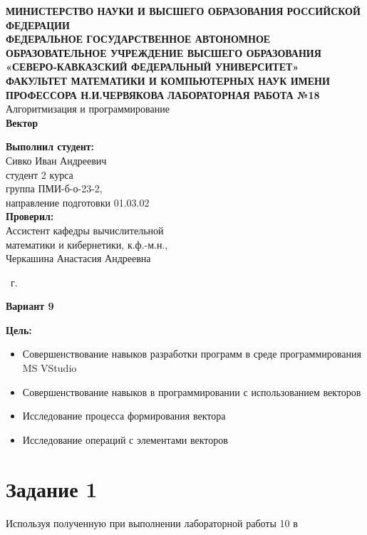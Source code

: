 \documentclass[14pt,a4paper]{article}
\begin{document}
\begin{titlepage}
  \begin{center}
    {\large\scshape\bfseries
    МИНИСТЕРСТВО НАУКИ И ВЫСШЕГО ОБРАЗОВАНИЯ РОССИЙСКОЙ ФЕДЕРАЦИИ\\
    ФЕДЕРАЛЬНОЕ ГОСУДАРСТВЕННОЕ АВТОНОМНОЕ ОБРАЗОВАТЕЛЬНОЕ УЧРЕЖДЕНИЕ ВЫСШЕГО
    ОБРАЗОВАНИЯ\\
    «СЕВЕРО-КАВКАЗСКИЙ ФЕДЕРАЛЬНЫЙ УНИВЕРСИТЕТ»\\
    ФАКУЛЬТЕТ МАТЕМАТИКИ И КОМПЬЮТЕРНЫХ НАУК ИМЕНИ ПРОФЕССОРА Н.И.ЧЕРВЯКОВА}
    \vfill
    \Large{\textbf{ЛАБОРАТОРНАЯ РАБОТА №18}}\\[2mm]
    \large{Алгоритмизация и программирование}\\[6mm]
    \large{\textbf{Вектор}}\\[20mm]
  \end{center}
  \begin{flushright}
    \large{
      \textbf{Выполнил студент:}\\
      Сивко Иван Андреевич\\
      студент 2 курса\\
      группа ПМИ-б-о-23-2,\\
      направление подготовки 01.03.02\\[5mm]
      \textbf{Проверил:}\\
      Ассистент кафедры вычислительной\\
      математики и кибернетики, к.ф.-м.н.,\\
      Черкашина Анастасия Андреевна}
  \end{flushright}
  \vfill
  \centerline{ \the\year\ г. }
\end{titlepage}

\centerline{\large\textbf{Вариант 9}}
\large{\textbf{Цель:}}
\begin{small}
  \begin{itemize}
    \item Совершенствование навыков разработки программ в среде
      программирования MS VStudio
    \item Совершенствование навыков в программировании с использованием векторов
    \item Исследование процесса формирования вектора
    \item Исследование операций с элементами векторов
  \end{itemize}
\end{small}
\section*{Задание 1}
Используя полученную при выполнении лабораторной работы 10 в
\end{document}
